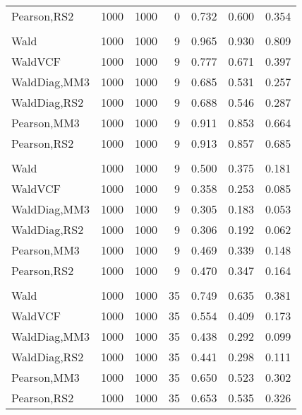 \documentclass[
]{article}
\begin{document}
\begin{table}[H]
{\begin{tabular}[t]{lrrrrrr}
\hspace{1em}Pearson,RS2 & 1000 & 1000 & 0 & 0.732 & 0.600 & 0.354\\
\addlinespace[0.3em]
\multicolumn{7}{l}{\textbf{1F 15V}}\\
\hspace{1em}Wald & 1000 & 1000 & 9 & 0.965 & 0.930 & 0.809\\
\hspace{1em}WaldVCF & 1000 & 1000 & 9 & 0.777 & 0.671 & 0.397\\
\hspace{1em}WaldDiag,MM3 & 1000 & 1000 & 9 & 0.685 & 0.531 & 0.257\\
\hspace{1em}WaldDiag,RS2 & 1000 & 1000 & 9 & 0.688 & 0.546 & 0.287\\
\hspace{1em}Pearson,MM3 & 1000 & 1000 & 9 & 0.911 & 0.853 & 0.664\\
\hspace{1em}Pearson,RS2 & 1000 & 1000 & 9 & 0.913 & 0.857 & 0.685\\
\addlinespace[0.3em]
\multicolumn{7}{l}{\textbf{2F 10V}}\\
\hspace{1em}Wald & 1000 & 1000 & 9 & 0.500 & 0.375 & 0.181\\
\hspace{1em}WaldVCF & 1000 & 1000 & 9 & 0.358 & 0.253 & 0.085\\
\hspace{1em}WaldDiag,MM3 & 1000 & 1000 & 9 & 0.305 & 0.183 & 0.053\\
\hspace{1em}WaldDiag,RS2 & 1000 & 1000 & 9 & 0.306 & 0.192 & 0.062\\
\hspace{1em}Pearson,MM3 & 1000 & 1000 & 9 & 0.469 & 0.339 & 0.148\\
\hspace{1em}Pearson,RS2 & 1000 & 1000 & 9 & 0.470 & 0.347 & 0.164\\
\addlinespace[0.3em]
\multicolumn{7}{l}{\textbf{3F 15V}}\\
\hspace{1em}Wald & 1000 & 1000 & 35 & 0.749 & 0.635 & 0.381\\
\hspace{1em}WaldVCF & 1000 & 1000 & 35 & 0.554 & 0.409 & 0.173\\
\hspace{1em}WaldDiag,MM3 & 1000 & 1000 & 35 & 0.438 & 0.292 & 0.099\\
\hspace{1em}WaldDiag,RS2 & 1000 & 1000 & 35 & 0.441 & 0.298 & 0.111\\
\hspace{1em}Pearson,MM3 & 1000 & 1000 & 35 & 0.650 & 0.523 & 0.302\\
\hspace{1em}Pearson,RS2 & 1000 & 1000 & 35 & 0.653 & 0.535 & 0.326\\
\bottomrule
\end{tabular}}
\endgroup{}
\end{table}
\end{document}
